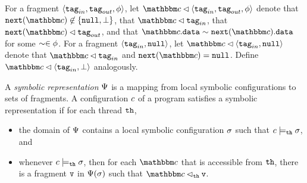 
For a fragment $\left\langle\mathtt{tag}_{in},\mathtt{tag}_{out},\phi\right\rangle$,
let $\cell \lhd \sllviewtuple$ denote that
$\mathtt{next}(\cell) \not\in \set{\nullconst,\dangconst}$, that
$\cell \lhd \inputtag$, that $\mathtt{next}(\cell) \lhd \outputtag$, 
and that
$\cell.\vals \sim \mathtt{next}(\cell).\vals$ for some
$\sim \in \phi$.
For a fragment $\left\langle\mathtt{tag}_{in},{\tt null}\right\rangle$, let
$\cell \lhd \tuple{\inputtag,\nullconst}$ denote that
$\cell \lhd \inputtag$ and $\mathtt{next}(\cell) = \nullconst$.
Define $\cell \lhd \tuple{\inputtag,\dangconst}$ analogously.

A {\em symbolic representation} $\Psi$ is a mapping from
local symbolic  configurations to sets of fragments.
A configuration $c$ of a program satisfies a symbolic representation
if for each thread ${\tt th}$, 
\begin{itemize}
\item the domain of $\Psi$ contains a local symbolic configuration
  $\sigma$ such that $c \models_{{\tt th}} \sigma$, and
\item whenever $c \models_{{\tt th}} \sigma$, then
for each $\cell$ that is accessible from ${\tt th}$, there is
  a fragment $\mathtt{v}$ in $\Psi(\sigma)$ such that
  $\cell \lhd_{\thread} \frag$.
\end{itemize}

